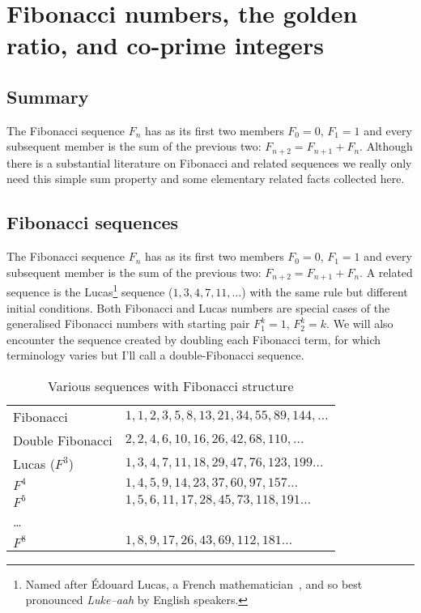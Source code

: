 
\chapter{Fibonacci numbers, the golden ratio, and co-prime integers}
\section*{Summary}{The Fibonacci sequence $F_n$ has as its first two members  $F_0=0$, $F_1=1$ and every subsequent member is the sum of the previous two:  $F_{n+2}=F_{n+1}+F_{n}$. Although there is a substantial literature on Fibonacci and related sequences we really only need this simple sum property and some elementary related facts collected here.}

\label{CH:0}
\label{ch:0}
\section{Fibonacci sequences}

The Fibonacci sequence $F_n$ has as its first two members  $F_0=0$, $F_1=1$ and every subsequent member is the sum of the previous two:  $F_{n+2}=F_{n+1}+F_{n}$. 
A related sequence is the Lucas\footnote{Named after Édouard Lucas, a French mathematician~\cite{ballotLucasSequencesTheory2023,decaillotEdouardLucas184218911999}, and so best pronounced \textit{Luke--aah} by English speakers.} sequence  ($1,3,4,7,11,\ldots$) with the same rule but different initial conditions. Both Fibonacci and Lucas numbers are special cases of the generalised Fibonacci numbers with starting pair $F^k_1=1$, $F^k_2=k$. We will also encounter the sequence created by doubling each Fibonacci term, for which terminology varies but I'll call a double-Fibonacci sequence. 
%
\begin{table}[ht]
	\caption{Various sequences with Fibonacci structure}
	\label{tab:sequences}
	\begin{center}
		\begin{tabular}{ll}
			\hline
			Fibonacci  &  $1,1,2,3,5,8,13,21,34,55,89,144,\ldots$ 
			\\
			Double Fibonacci & $2,2,4,6,10,16,26,42,68,110,\ldots$
			\\
			Lucas ($F^3$)&      $ 1,3,4,7,11,18,29,47,76,123,199\ldots$
			\\
			$F^4$  & $1,4,5,9,14,23,37,60,97,157\ldots$
			\\
			$F^5$ & $1,5,6,11,17,28,45,73,118,191\ldots$
			\\
			\ldots &
			\\
			$F^8$ & $1,8,9,17,26,43,69,112,181\ldots$
			\\
			\hline
		\end{tabular}
	
	\end{center}
\end{table}
%

